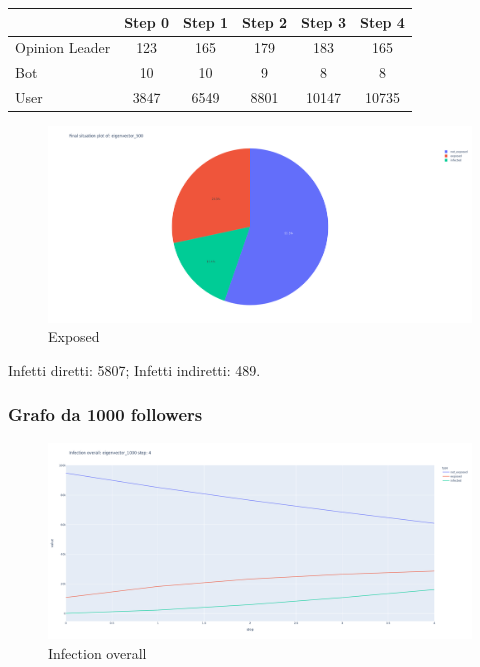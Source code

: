         \begin{table}[H]
            \centering
            \begin{tabular}{|l|c|c|c|c|c|}
            \hline
                           & Step 0 & Step 1 & Step 2 & Step 3 & Step 4 \\ \hline
            Opinion Leader & 123    & 165    & 179    & 183    & 165    \\ \hline
            Bot            & 10     & 10     & 9      & 8      & 8      \\ \hline
            User           & 3847   & 6549   & 8801   & 10147  & 10735  \\ \hline
            \end{tabular}
        \end{table}
        
        \begin{figure}[H]
            \includegraphics[width=16cm]{resources/charts/eig_500_pie.png}
            \caption{Exposed}
            \label{fig:btw_1500_pie}
        \end{figure}
        Infetti diretti: 5807;\newline
        Infetti indiretti: 489.
        
        \subsubsection{Grafo da 1000 followers}
        \begin{figure}[H]
                \includegraphics[width=16cm]{resources/charts/eig_1000_line.png}
                \caption{Infection overall}
                \label{fig:eig_1000_line}
        \end{figure}
        
